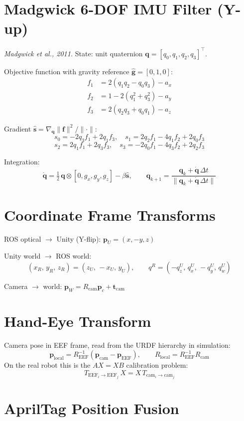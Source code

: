 \documentclass[11pt,a4paper]{article}
\begin{document}
\section{Madgwick 6-DOF IMU Filter (Y-up)}

\textit{Madgwick et al., 2011.} State: unit quaternion $\mathbf{q} = [q_0,q_1,q_2,q_3]^\top$.

Objective function with gravity reference $\hat{\mathbf{g}} = [0,1,0]$:
\begin{align*}
f_1 &= 2(q_1 q_2 - q_0 q_3) - a_x \\
f_2 &= 1 - 2(q_1^2 + q_3^2) - a_y \\
f_3 &= 2(q_2 q_3 + q_0 q_1) - a_z
\end{align*}

Gradient $\hat{\mathbf{s}} = \nabla_{\mathbf{q}}\|\mathbf{f}\|^2 / \|\cdot\|$:
\[
s_0 = -2q_3 f_1 + 2q_1 f_3, \quad
s_1 = 2q_2 f_1 - 4q_1 f_2 + 2q_0 f_3
\]
\[
s_2 = 2q_1 f_1 + 2q_3 f_3, \quad
s_3 = -2q_0 f_1 - 4q_3 f_2 + 2q_2 f_3
\]

Integration:
\[
\dot{\mathbf{q}} = \tfrac{1}{2}\,\mathbf{q}\otimes[0,g_x,g_y,g_z] - \beta\hat{\mathbf{s}}, \qquad
\mathbf{q}_{k+1} = \frac{\mathbf{q}_k + \dot{\mathbf{q}}\,\Delta t}{\|\mathbf{q}_k + \dot{\mathbf{q}}\,\Delta t\|}
\]

\section{Coordinate Frame Transforms}

ROS optical $\to$ Unity (Y-flip): $\mathbf{p}_U = (x,-y,z)$

Unity world $\to$ ROS world:
\[
(x_R,\,y_R,\,z_R) = (z_U,\,-x_U,\,y_U), \qquad
q^R = (-q^U_z,\,q^U_x,\,-q^U_y,\,q^U_w)
\]

Camera $\to$ world: $\mathbf{p}_W = R_\text{cam}\mathbf{p}_c + \mathbf{t}_\text{cam}$

\section{Hand-Eye Transform}

Camera pose in EEF frame, read from the URDF hierarchy in simulation:
\[
\mathbf{p}_\text{local} = R_\text{EEF}^{-1}(\mathbf{p}_\text{cam} - \mathbf{p}_\text{EEF}), \qquad
R_\text{local} = R_\text{EEF}^{-1}R_\text{cam}
\]
On the real robot this is the $AX = XB$ calibration problem:
\[
T_{\text{EEF}_i\to\text{EEF}_j}\,X = X\,T_{\text{cam}_i\to\text{cam}_j}
\]

\section{AprilTag Position Fusion}
\end{document}
